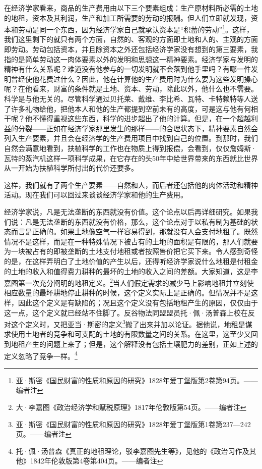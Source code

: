 \documentclass[a4paper,twoside,12pt,AutoFakeBold]{ctexart}
\begin{document}
在经济学家看来，商品的生产费用由以下三个要素组成：生产原材料所必需的土地的地租，资本及其利润，生产和加工所需要的劳动的报酬。但人们立即就发现，资本和劳动是同一个东西，因为经济学家自己就承认资本是“积蓄的劳动”\footnote{亚·斯密《国民财富的性质和原因的研究》1828年爱丁堡版第2卷第94页。——编者注}。这样，我们这里剩下的就只有两个方面，自然的、客观的方面即土地和人的、主观的方面即劳动。劳动包括资本，并且除资本之外还包括经济学家没有想到的第三要素，我指的是简单劳动这一肉体要素以外的发明和思想这一精神要素。经济学家与发明的精神有什么关系呢？难道没有他参与的一切发明就不会落到他手里吗？有哪一件发明曾经使他花费过什么？因此，他在计算他的生产费用时为什么要为这些发明操心呢？在他看来，财富的条件就是土地、资本、劳动，除此以外，他什么也不需要。科学是与他无关的。尽管科学通过贝托莱、戴维、李比希、瓦特、卡特赖特等人送了许多礼物给他，把他本人和他的生产都提到空前未有的高度，可是这与他有何相干呢？他不懂得重视这些东西，科学的进步超出了他的计算。但是，在一个超越利益的分裂——正如在经济学家那里发生的那样——的合理状态下，精神要素自然会列入生产要素，并且会在经济学的生产费用项目中找到自己的位置。到那时，我们自然会满意地看到，扶植科学的工作也在物质上得到报偿，会看到，仅仅詹姆斯·瓦特的蒸汽机这样一项科学成果，在它存在的头50年中给世界带来的东西就比世界从一开始为扶植科学所付出的代价还要多。

这样，我们就有了两个生产要素——自然和人，而后者还包括他的肉体活动和精神活动。现在我们可以回过来谈谈经济学家和他的生产费用。

经济学家说，凡是无法垄断的东西就没有价值。这个论点以后再详细研究。如果我们说：凡是无法垄断的东西就没有价格，那么，这个论点对于以私有制为基础的状态而言是正确的。如果土地像空气一样容易得到，那就没有人会支付地租了。既然情况不是这样，而是在一种特殊情况下被占有的土地的面积是有限的，那人们就要为一块被占有的即被垄断的土地支付地租或者按照售价把它买下来。令人感到奇怪的是，在这样弄明白了土地价值的产生以后，还得听经济学家说什么地租是付租金的土地的收入和值得费力耕种的最坏的土地的收入之间的差额。大家知道，这是李嘉图第一次充分阐明的地租定义。\footnote{大·李嘉图《政治经济学和赋税原理》1817年伦敦版第54页。——编者注}当人们假定需求的减少马上影响地租并立刻使相应数量的最坏耕地停止耕种的时候，这个定义实际上是正确的。但情况并不是这样，因此这个定义是有缺陷的；况且这个定义没有包括地租产生的原因，仅仅由于这一点，这个定义就已经站不住脚了。反谷物法同盟盟员托·佩·汤普森上校在反对这个定义时，又把亚当·斯密的定义\footnote{亚·斯密《国民财富的性质和原因的研究》1828年爱丁堡版第1卷第237—242页。——编者注}搬了出来并加以论证。据他说，地租是谋求使用土地者的竞争和可支配的土地的有限数量之间的关系。在这里，这至少又回到地租产生的问题上来了；但是，这个解释没有包括土壤肥力的差别，正如上述的定义忽略了竞争一样。\footnote{托·佩·汤普森《真正的地租理论，驳李嘉图先生等》，见他的《政治习作及其他》1842年伦敦版第4卷第404页。——编者注}
\end{document}
